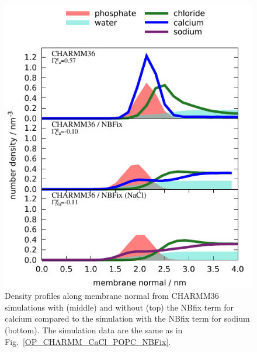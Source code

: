 \documentclass[journal=jpcbfk,manuscript=article]{achemso}
\begin{document}
\begin{figure}[]
  \centering
  \includegraphics[width=17.0cm]{../Figs/density_profile_CHARMM_CaCl_POPC_NBFix.pdf}
  \caption{\label{density_profile_CHARMM_CaCl_POPC_NBFix}
    Density profiles along membrane normal from CHARMM36 simulations with (middle)
    and without (top) the NBfix term for calcium \cite{kim16} compared to the simulation
    with the NBfix term for sodium \cite{venable13} (bottom). The simulation data are the same as in Fig.~\ref{OP_CHARMM_CaCl_POPC_NBFix}.
  }
\end{figure}


\clearpage
\end{document}
